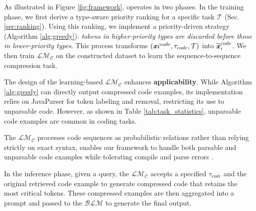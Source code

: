 
As illustrated in Figure \ref{fig:framework}, \ourtool operates in two phases.
In the training phase, we first derive a type-aware priority ranking for a specific task $\mathcal{T}$ (Sec. \ref{sec:ranking}). Using this ranking, we implement a priority-driven strategy (Algorithm \ref{alg:greedy}): \textit{tokens in higher-priority types are discarded before those in lower-priority types}. This process transforms $(\textbf{\textit{x}}i^{code}, \tau_{code}, \mathcal{T})$ into $\widetilde{\textbf{\textit{x}}}_i^{code}$. We then train $\mathcal{LM_C}$ on the constructed dataset to learn the sequence-to-sequence compression task.

The design of the learning-based $\mathcal{LM_C}$ enhances \textbf{applicability}. While Algorithm \ref{alg:greedy} can directly output compressed code examples, its implementation relies on JavaParser for token labeling and removal, restricting its use to unparsable code. However, as shown in Table \ref{tab:task_statistics},  unparsable code examples are common in coding tasks.

The $\mathcal{LM_C}$ processes code sequences as probabilistic relations \citep{recomp,lingua2} rather than relying strictly on exact syntax, enables our framework to handle both parsable and unparsable code examples while tolerating compile and parse errors \citep{learning}.

In the inference phase, given a query, the $\mathcal{LM_C}$ accepts a specified $\tau_{code}$ and the original retrieved code example to generate compressed code that retains the most critical tokens. These compressed examples are then aggregated into a prompt and passed to the $\mathcal{BLM}$ to generate the final output.



